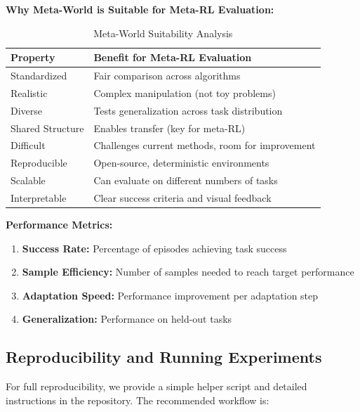 \documentclass[12pt]{article}
\newcommand{\ieee}[1]{\textcolor{IEEEBlue}{\textbf{#1}}}
\begin{document}
{{			\ieee{Why Meta-World is Suitable for Meta-RL Evaluation:}
			
			\begin{table}[H]
			\centering
			\caption{Meta-World Suitability Analysis}
			\begin{tabular}{@{}ll@{}}
			\toprule
			\textbf{Property} & \textbf{Benefit for Meta-RL Evaluation} \\
			\midrule
			Standardized & Fair comparison across algorithms \\
			Realistic & Complex manipulation (not toy problems) \\
			Diverse & Tests generalization across task distribution \\
			Shared Structure & Enables transfer (key for meta-RL) \\
			Difficult & Challenges current methods, room for improvement \\
			Reproducible & Open-source, deterministic environments \\
			Scalable & Can evaluate on different numbers of tasks \\
			Interpretable & Clear success criteria and visual feedback \\
			\bottomrule
			\end{tabular}
			\label{tab:metaworld_suitability}
			\end{table}
			
			\ieee{Performance Metrics:}
			
			\begin{enumerate}
				\item \textbf{Success Rate:} Percentage of episodes achieving task success
				\item \textbf{Sample Efficiency:} Number of samples needed to reach target performance
				\item \textbf{Adaptation Speed:} Performance improvement per adaptation step
				\item \textbf{Generalization:} Performance on held-out tasks
			\end{enumerate}
			
			\subsection{Reproducibility and Running Experiments}
			
			For full reproducibility, we provide a simple helper script and detailed instructions in the repository. The recommended workflow is:
			
}}
\end{document}
